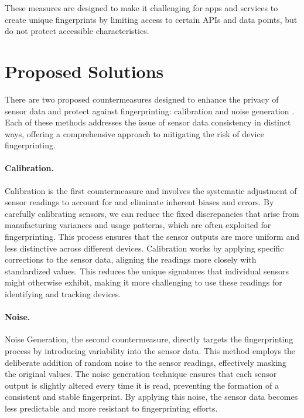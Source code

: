 \documentclass[11pt,
  oneside,openany,    %
]{scrreprt}
\begin{document}
These measures are designed to make it challenging for apps and services to create unique fingerprints by limiting access to certain APIs and data points, but do not protect accessible characteristics.

\section{Proposed Solutions}
\label{sec:proposed}
There are two proposed countermeasures designed to enhance the privacy of sensor data and protect against fingerprinting: calibration and noise generation \cite{das2015exploring}. 
Each of these methods addresses the issue of sensor data consistency in distinct ways, offering a comprehensive approach to mitigating the risk of device fingerprinting.

\paragraph{Calibration.}
\label{par:calibration}
Calibration is the first countermeasure and involves the systematic adjustment of sensor readings to account for and eliminate inherent biases and errors. 
By carefully calibrating sensors, we can reduce the fixed discrepancies that arise from manufacturing variances and usage patterns, which are often exploited for fingerprinting. 
This process ensures that the sensor outputs are more uniform and less distinctive across different devices. 
Calibration works by applying specific corrections to the sensor data, aligning the readings more closely with standardized values. 
This reduces the unique signatures that individual sensors might otherwise exhibit, making it more challenging to use these readings for identifying and tracking devices.

\paragraph{Noise.}
\label{par:noise}
Noise Generation, the second countermeasure, directly targets the fingerprinting process by introducing variability into the sensor data. 
This method employs the deliberate addition of random noise to the sensor readings, effectively masking the original values. 
The noise generation technique ensures that each sensor output is slightly altered every time it is read, preventing the formation of a consistent and stable fingerprint. 
By applying this noise, the sensor data becomes less predictable and more resistant to fingerprinting efforts.
\end{document}

